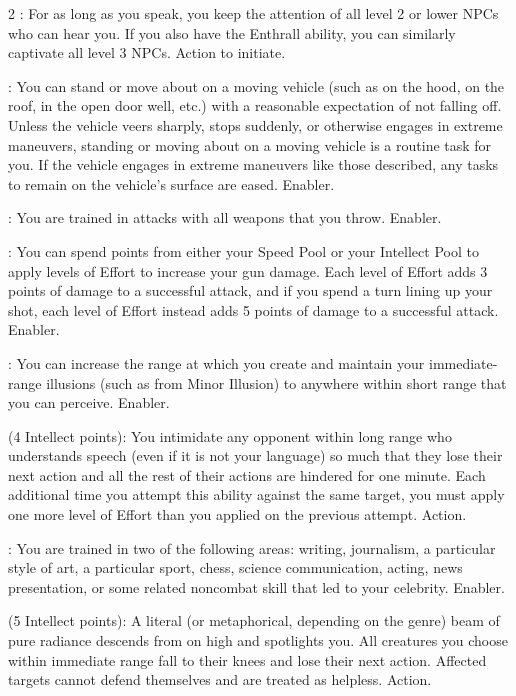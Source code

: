 \begin{multicols}{2}
: For as long as you speak, you keep the attention of all level 2 or lower NPCs who can hear you. If you also have the Enthrall ability, you can similarly captivate all level 3 NPCs. Action to initiate. 

: You can stand or move about on a moving vehicle (such as on the hood, on the roof, in the open door well, etc.) with a reasonable expectation of not falling off. Unless the vehicle veers sharply, stops suddenly, or otherwise engages in extreme maneuvers, standing or moving about on a moving vehicle is a routine task for you. If the vehicle engages in extreme maneuvers like those described, any tasks to remain on the vehicle’s surface are eased. Enabler. 

: You are trained in attacks with all weapons that you throw. Enabler. 

: You can spend points from either your Speed Pool or your Intellect Pool to apply levels of Effort to increase your gun damage. Each level of Effort adds 3 points of damage to a successful attack, and if you spend a turn lining up your shot, each level of Effort instead adds 5 points of damage to a successful attack. Enabler. 

: You can increase the range at which you create and maintain your immediate-range illusions (such as from Minor Illusion) to anywhere within short range that you can perceive. Enabler. 

 (4 Intellect points): You intimidate any opponent within long range who understands speech (even if it is not your language) so much that they lose their next action and all the rest of their actions are hindered for one minute. Each additional time you attempt this ability against the same target, you must apply one more level of Effort than you applied on the previous attempt. Action. 

: You are trained in two of the following areas: writing, journalism, a particular style of art, a particular sport, chess, science communication, acting, news presentation, or some related noncombat skill that led to your celebrity. Enabler. 

 (5 Intellect points): A literal (or metaphorical, depending on the genre) beam of pure radiance descends from on high and spotlights you. All creatures you choose within immediate range fall to their knees and lose their next action. Affected targets cannot defend themselves and are treated as helpless. Action. 


\end{multicols}
